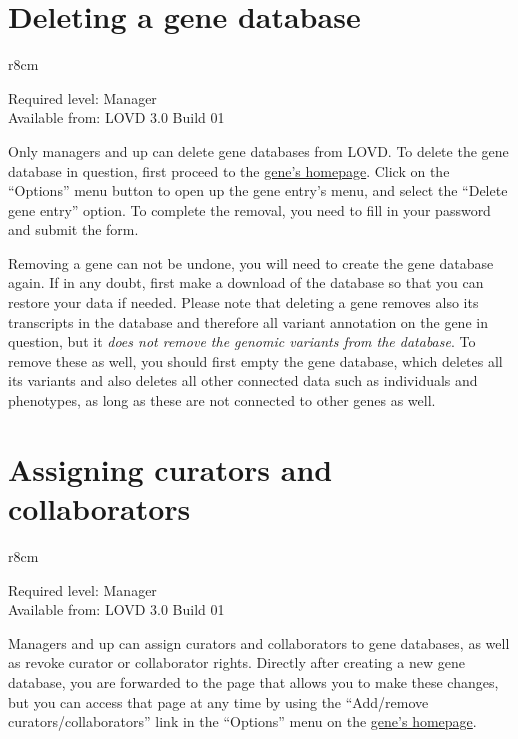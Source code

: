 \hypertarget{sec:gene_delete}{}
\section{Deleting a gene database}
\begin{wrapfigure}[3]{r}{8cm} %
  \vspace{-25pt}
  \begin{leftbar}
    Required level: Manager\\
    Available from: LOVD 3.0 Build 01
  \end{leftbar}
\end{wrapfigure}
Only managers and up can delete gene databases from LOVD.
To delete the gene database in question, first proceed to the \hyperlink{sec:gene_homepage}{gene's homepage}.
Click on the ``Options'' menu button to open up the gene entry's menu, and select the ``Delete gene entry'' option.
To complete the removal, you need to fill in your password and submit the form.

\begin{warntable}
Removing a gene can not be undone, you will need to create the gene database again.
If in any doubt, first make a download of the database so that you can restore your data if needed.
Please note that deleting a gene removes also its transcripts in the database and therefore
 all variant annotation on the gene in question, but it \emph{does not remove the genomic variants from the database}.
To remove these as well, you should first empty the gene database, which deletes all its variants and also deletes
 all other connected data such as individuals and phenotypes, as long as these are not connected to other genes as well.
\end{warntable}





\hypertarget{sec:gene_assign_curators}{}
\section{Assigning curators and collaborators}
\begin{wrapfigure}[3]{r}{8cm} %
  \vspace{-25pt}
  \begin{leftbar}
    Required level: Manager\\
    Available from: LOVD 3.0 Build 01
  \end{leftbar}
\end{wrapfigure}
Managers and up can assign curators and collaborators to gene databases, as well as revoke curator or collaborator rights.
Directly after creating a new gene database, you are forwarded to the page that allows you to make these changes,
 but you can access that page at any time by using the ``Add/remove curators/collaborators'' link in the
 ``Options'' menu on the \hyperlink{sec:gene_homepage}{gene's homepage}.

